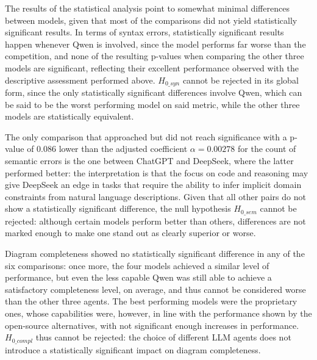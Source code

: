 The results of the statistical analysis point to somewhat minimal differences between models, given that most of the comparisons did not yield statistically significant results. In terms of syntax errors, statistically significant results happen whenever Qwen is involved, since the model performs far worse than the competition, and none of the resulting p-values when comparing the other three models are significant, reflecting their excellent performance observed with the descriptive assessment performed above. ${H_{0\_{syn}}}$ cannot be rejected in its global form, since the only statistically significant differences involve Qwen, which can be said to be the worst performing model on said metric, while the other three models are statistically equivalent.

The only comparison that approached but did not reach significance with a p-value of 0.086 lower than the adjusted coefficient $\alpha = 0.00278$ for the count of semantic errors is the one between ChatGPT and DeepSeek, where the latter performed better: the interpretation is that the focus on code and reasoning may give DeepSeek an edge in tasks that require the ability to infer implicit domain constraints from natural language descriptions. Given that all other pairs do not show a statistically significant difference, the null hypothesis ${H_{0\_{sem}}}$ cannot be rejected: although certain models perform better than others, differences are not marked enough to make one stand out as clearly superior or worse.

Diagram completeness showed no statistically significant difference in any of the six comparisons: once more, the four models achieved a similar level of performance, but even the less capable Qwen was still able to achieve a satisfactory completeness level, on average, and thus cannot be considered worse than the other three agents. The best performing models were the proprietary ones, whose capabilities were, however, in line with the performance shown by the open-source alternatives, with not significant enough increases in performance. ${H_{0\_{compl}}}$ thus cannot be rejected: the choice of different LLM agents does not introduce a statistically significant impact on diagram completeness.



